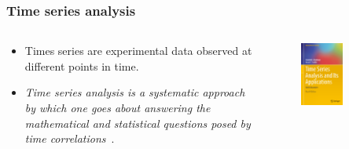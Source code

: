 \documentclass[aspectratio=169]{beamer}
\begin{document}
\begin{frame}
    \frametitle{Time series analysis}
    \begin{columns}
        \begin{column}{0.5\textwidth}
        \begin{itemize}
            \item Times series are experimental data observed at different 
                points in time.
            \item \emph{Time series analysis is a systematic approach by which 
                one goes about answering the mathematical and statistical 
                questions posed by time correlations}~\cite{shumway2017}.
        \end{itemize}
        \end{column}
        \begin{column}{0.5\textwidth}
            \begin{figure}
                \centering
                \includegraphics[width=0.6\textwidth]{img/shumway2017.png}
            \end{figure}
        \end{column}
    \end{columns}
\end{frame}
\end{document}
